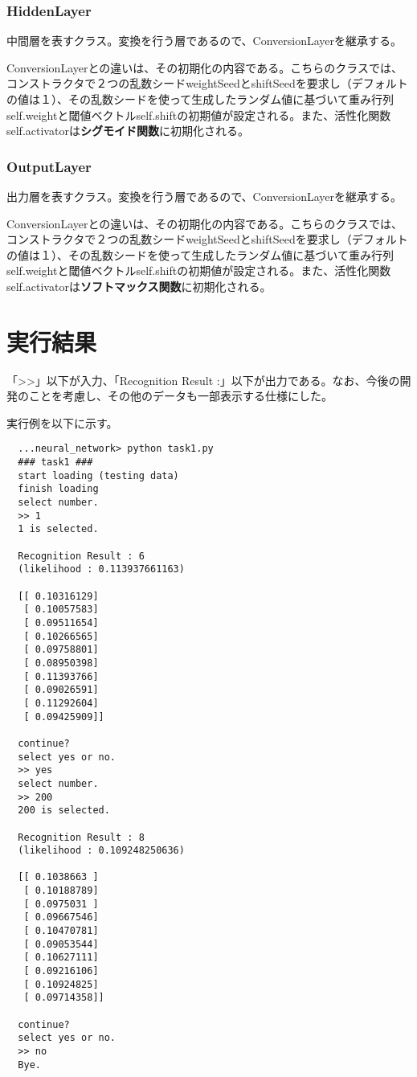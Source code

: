\documentclass{ujarticle} %
\begin{document}
\subsubsection{HiddenLayer}
中間層を表すクラス。変換を行う層であるので、ConversionLayerを継承する。

ConversionLayerとの違いは、その初期化の内容である。こちらのクラスでは、コンストラクタで２つの乱数シードweightSeedとshiftSeedを要求し（デフォルトの値は１）、その乱数シードを使って生成したランダム値に基づいて重み行列self.weightと閾値ベクトルself.shiftの初期値が設定される。また、活性化関数self.activatorは\textbf{シグモイド関数}に初期化される。

\subsubsection{OutputLayer}
出力層を表すクラス。変換を行う層であるので、ConversionLayerを継承する。

ConversionLayerとの違いは、その初期化の内容である。こちらのクラスでは、コンストラクタで２つの乱数シードweightSeedとshiftSeedを要求し（デフォルトの値は１）、その乱数シードを使って生成したランダム値に基づいて重み行列self.weightと閾値ベクトルself.shiftの初期値が設定される。また、活性化関数self.activatorは\textbf{ソフトマックス関数}に初期化される。


\section{実行結果}

「\textgreater\textgreater」以下が入力、「Recognition Result :」以下が出力である。なお、今後の開発のことを考慮し、その他のデータも一部表示する仕様にした。

実行例を以下に示す。

\begin{verbatim}
  ...neural_network> python task1.py
  ### task1 ###
  start loading (testing data)
  finish loading
  select number.
  >> 1
  1 is selected.

  Recognition Result : 6
  (likelihood : 0.113937661163)

  [[ 0.10316129]
   [ 0.10057583]
   [ 0.09511654]
   [ 0.10266565]
   [ 0.09758801]
   [ 0.08950398]
   [ 0.11393766]
   [ 0.09026591]
   [ 0.11292604]
   [ 0.09425909]]

  continue?
  select yes or no.
  >> yes
  select number.
  >> 200
  200 is selected.

  Recognition Result : 8
  (likelihood : 0.109248250636)

  [[ 0.1038663 ]
   [ 0.10188789]
   [ 0.0975031 ]
   [ 0.09667546]
   [ 0.10470781]
   [ 0.09053544]
   [ 0.10627111]
   [ 0.09216106]
   [ 0.10924825]
   [ 0.09714358]]

  continue?
  select yes or no.
  >> no
  Bye.
\end{verbatim}
\end{document}
